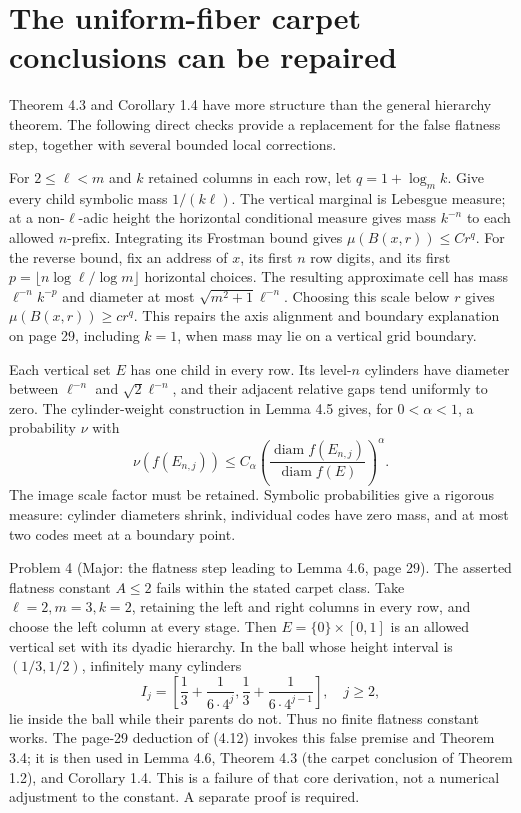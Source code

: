 \documentclass[10pt]{article}
\begin{document}
\section*{The uniform-fiber carpet conclusions can be repaired}
Theorem 4.3 and Corollary 1.4 have more structure than the general hierarchy theorem. The following direct checks provide a replacement for the false flatness step, together with several bounded local corrections.\par
For \(2\le\ell<m\) and \(k\) retained columns in each row, let \(q=1+\log_m k\). Give every child symbolic mass \(1/(k\ell)\). The vertical marginal is Lebesgue measure; at a non-\(\ell\)-adic height the horizontal conditional measure gives mass \(k^{-n}\) to each allowed \(n\)-prefix. Integrating its Frostman bound gives \(\mu(B(x,r))\le Cr^q\). For the reverse bound, fix an address of \(x\), its first \(n\) row digits, and its first \(p=\lfloor n\log\ell/\log m\rfloor\) horizontal choices. The resulting approximate cell has mass \(\ell^{-n}k^{-p}\) and diameter at most \(\sqrt{m^2+1}\ell^{-n}\). Choosing this scale below \(r\) gives \(\mu(B(x,r))\ge cr^q\). This repairs the axis alignment and boundary explanation on page 29, including \(k=1\), when mass may lie on a vertical grid boundary.\par
Each vertical set \(E\) has one child in every row. Its level-\(n\) cylinders have diameter between \(\ell^{-n}\) and \(\sqrt2\ell^{-n}\), and their adjacent relative gaps tend uniformly to zero. The cylinder-weight construction in Lemma 4.5 gives, for \(0<\alpha<1\), a probability \(\nu\) with \[\nu(f(E_{n,j}))\le C_\alpha
 \left(\frac{\operatorname{diam}f(E_{n,j})}{\operatorname{diam}f(E)}\right)^\alpha .
 \tag{5}\] The image scale factor must be retained. Symbolic probabilities give a rigorous measure: cylinder diameters shrink, individual codes have zero mass, and at most two codes meet at a boundary point.\par
Problem 4 (Major: the flatness step leading to Lemma 4.6, page 29).  The asserted flatness constant \(A\le2\) fails within the stated carpet class. Take \(\ell=2,m=3,k=2\), retaining the left and right columns in every row, and choose the left column at every stage. Then \(E=\{0\}\times[0,1]\) is an allowed vertical set with its dyadic hierarchy. In the ball whose height interval is \((1/3,1/2)\), infinitely many cylinders \[I_j=\left[\frac13+\frac1{6\cdot4^j},
           \frac13+\frac1{6\cdot4^{j-1}}\right],
 \quad j\ge2,\] lie inside the ball while their parents do not. Thus no finite flatness constant works. The page-29 deduction of (4.12) invokes this false premise and Theorem 3.4; it is then used in Lemma 4.6, Theorem 4.3 (the carpet conclusion of Theorem 1.2), and Corollary 1.4. This is a failure of that core derivation, not a numerical adjustment to the constant. A separate proof is required.\par
\end{document}
